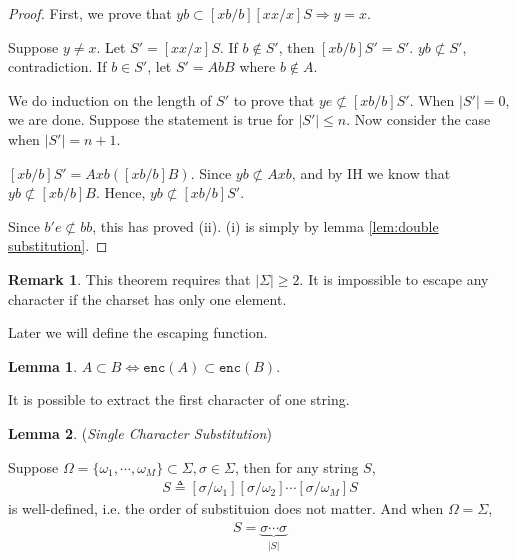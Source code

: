 \documentclass{article}
\theoremstyle{definition}
\newtheorem{lemma}{Lemma}[section]
\newtheorem*{remark}{Remark}
\begin{document}
\begin{proof}
    First, we prove that $yb \subset [xb/b][xx/x]S \Rightarrow y=x$.

    Suppose $y\neq x$. Let $S' = [xx/x]S$. If $b\notin S'$, then $[xb/b]S'=S'$. $yb \not\subset S'$, contradiction. If $b\in S'$, let $S'=AbB$ where $b\notin A$.

    We do induction on the length of $S'$ to prove that $ye \not\subset [xb/b]S'$. When $|S'|=0$, we are done. Suppose the statement is true for $|S'|\leq n$. Now consider the case when $|S'|=n+1$.

    $[xb/b]S' = Axb([xb/b]B)$. Since $yb \not\subset Axb$, and by IH we know that $yb \not\subset [xb/b]B$. Hence, $yb \not\subset [xb/b]S'$.

    Since $b'e\not\subset bb$, this has proved (ii). (i) is simply by lemma \ref{lem:double substitution}.
\end{proof}

\begin{remark}
    This theorem requires that $|\Sigma|\geq 2$. It is impossible to escape any character if the charset has only one element.
\end{remark}

Later we will define the escaping function.

\begin{lemma}
    $A\subset B\Leftrightarrow \mathtt{enc}(A)\subset \mathtt{enc}(B)$.
\end{lemma}

It is possible to extract the first character of one string.

\begin{lemma}
    (\emph{Single Character Substitution})

    Suppose $\Omega  = \{\omega_1,\cdots,\omega_M\}\subset \Sigma,\sigma \in \Sigma$, then for any string $S$,
    \begin{align}
        [\sigma/\Omega]S \triangleq [\sigma/\omega_1][\sigma/\omega_2]\cdots[\sigma/\omega_M]S
    \end{align}
    is well-defined, i.e. the order of substituion does not matter. And when $\Omega=\Sigma$,
    \begin{align}
        [\sigma/\Sigma]S = \underbrace{\sigma\cdots\sigma}_{|S|}
    \end{align}
    \label{lem:single character substitution}
\end{lemma}
\end{document}
